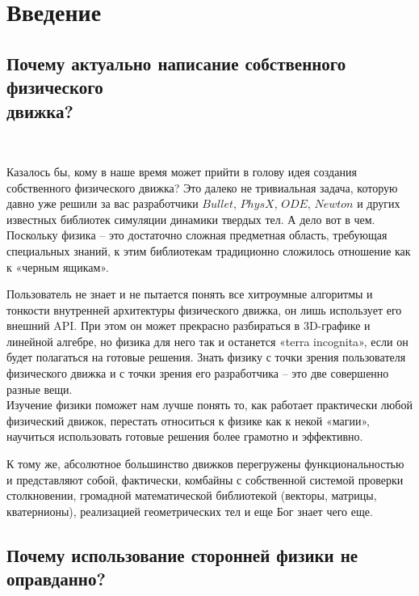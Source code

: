 \chapter*{Введение}

\section{Почему актуально написание собственного физического \\ движка?} 
\

Казалось бы, кому в наше время может прийти в голову
идея создания собственного физического движка? Это далеко не
тривиальная задача, которую давно уже решили за вас
разработчики $Bullet$, $PhysX$, $ODE$, $Newton$ и других известных
библиотек симуляции динамики твердых тел. А дело вот в чем.
\\

Поскольку физика – это достаточно сложная предметная
область, требующая специальных знаний, к этим библиотекам
традиционно сложилось отношение как к «черным ящикам».

Пользователь не знает и не пытается понять все хитроумные
алгоритмы и тонкости внутренней архитектуры физического
движка, он лишь использует его внешний API. При этом он
может прекрасно разбираться в 3D-графике и линейной
алгебре, но физика для него так и останется «terra incognita»,
если он будет полагаться на готовые решения.
Знать физику с точки зрения пользователя физического
движка и с точки зрения его разработчика – это две совершенно
разные вещи.
\\

Изучение физики поможет нам лучше понять то,
как работает практически любой физический движок, перестать
относиться к физике как к некой «магии», научиться
использовать готовые решения более грамотно и эффективно.

К тому же, абсолютное большинство движков перегружены 
функциональностью и представляют собой, фактически,
комбайны с собственной системой проверки столкновении,
громадной математической библиотекой (векторы, матрицы,
кватернионы), реализацией геометрических тел и еще Бог знает
чего еще. 

\section{Почему использование сторонней физики не оправданно?} 
\

